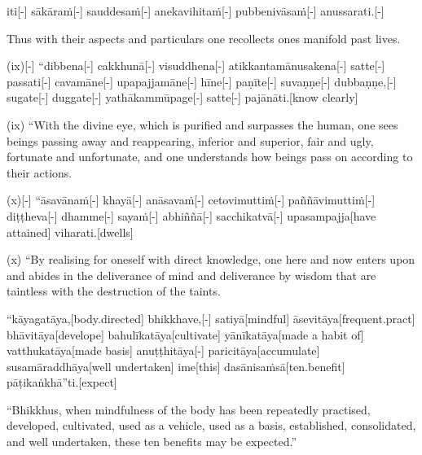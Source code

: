 \begin{samepage}
\begingl[glneveryline={\PaliGlossA,\PaliGlossB}]
iti[-] sākāraṁ[-] sauddesaṁ[-] anekavihitaṁ[-] pubbenivāsaṁ[-] anussarati.[-]
\endgl
\nopagebreak
\linespread{0.5}
\begin{spacin}{0.2}
{\PaliGlossFT Thus with their aspects and particulars one recollects ones manifold past lives.}
\end{spacin}
\vskip 12pt
\end{samepage}
\begin{samepage}
\begingl[glneveryline={\PaliGlossA,\PaliGlossB}]
(ix)[-] “dibbena[-] cakkhunā[-] visuddhena[-] atikkantamānusakena[-] satte[-] passati[-] cavamāne[-] upapajjamāne[-] hīne[-] paṇīte[-] suvaṇṇe[-] dubbaṇṇe,[-] sugate[-] duggate[-] yathākammūpage[-] satte[-] pajānāti.[know clearly]
\endgl
\nopagebreak
\linespread{0.5}
\begin{spacin}{0.2}
{\PaliGlossFT (ix) “With the divine eye, which is purified and surpasses the human, one sees beings passing away and reappearing, inferior and superior, fair and ugly, fortunate and unfortunate, and one understands how beings pass on according to their actions.}
\end{spacin}
\vskip 12pt
\end{samepage}
\begin{samepage}
\begingl[glneveryline={\PaliGlossA,\PaliGlossB}]
(x)[-] “āsavānaṁ[-] khayā[-] anāsavaṁ[-] cetovimuttiṁ[-] paññāvimuttiṁ[-] diṭṭheva[-] dhamme[-] sayaṁ[-] abhiññā[-] sacchikatvā[-] upasampajja[have attained] viharati.[dwells]
\endgl
\nopagebreak
\linespread{0.5}
\begin{spacin}{0.2}
{\PaliGlossFT (x) “By realising for oneself with direct knowledge, one here and now enters upon and abides in the deliverance of mind and deliverance by wisdom that are taintless with the destruction of the taints.}
\end{spacin}
\vskip 12pt
\end{samepage}
\begin{samepage}
\begingl[glneveryline={\PaliGlossA,\PaliGlossB}]
“kāyagatāya,[body.directed] bhikkhave,[-] satiyā[mindful] āsevitāya[frequent.pract] bhāvitāya[develope] bahulīkatāya[cultivate] yānīkatāya[made a habit of] vatthukatāya[made basis] anuṭṭhitāya[-] paricitāya[accumulate] susamāraddhāya[well undertaken] ime[this] dasānisaṁsā[ten.benefit] pāṭikaṅkhā”ti.[expect]
\endgl
\nopagebreak
\linespread{0.5}
\begin{spacin}{0.2}
{\PaliGlossFT “Bhikkhus, when mindfulness of the body has been repeatedly practised, developed, cultivated, used as a vehicle, used as a basis, established, consolidated, and well undertaken, these ten benefits may be expected.”}
\end{spacin}
\vskip 12pt
\end{samepage}
